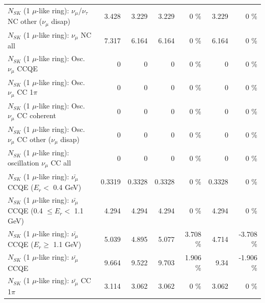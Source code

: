\begin{table}
\begin{tabular}{| l | r | r | r  r | r  r |}
   $N_{SK}$ (1 $\mu$-like ring): $\nu_\mu$/$\nu_\tau$ NC other ($\nu_\mu$ disap) &           3.428 &           3.229 &           3.229 &        0 \%  &           3.229 &        0 \%  \\ 
                                $N_{SK}$ (1 $\mu$-like ring): $\nu_{\mu}$ NC all &           7.317 &           6.164 &           6.164 &        0 \%  &           6.164 &        0 \%  \\ 
\hline
\hline
                               $N_{SK}$ (1 $\mu$-like ring): Osc. $\nu_\mu$ CCQE &               0 &               0 &               0 &        0 \%  &               0 &        0 \%  \\ 
                          $N_{SK}$ (1 $\mu$-like ring): Osc. $\nu_\mu$ CC 1$\pi$ &               0 &               0 &               0 &        0 \%  &               0 &        0 \%  \\ 
                        $N_{SK}$ (1 $\mu$-like ring): Osc. $\nu_\mu$ CC coherent &               0 &               0 &               0 &        0 \%  &               0 &        0 \%  \\ 
         $N_{SK}$ (1 $\mu$-like ring): Osc. $\nu_\mu$ CC other ($\nu_\mu$ disap) &               0 &               0 &               0 &        0 \%  &               0 &        0 \%  \\ 
                      $N_{SK}$ (1 $\mu$-like ring): oscillation $\nu_\mu$ CC all &               0 &               0 &               0 &        0 \%  &               0 &        0 \%  \\ 
\hline
\hline
          $N_{SK}$ (1 $\mu$-like ring): $\bar{\nu_\mu}$ CCQE ($E_{r} <$ 0.4 GeV) &          0.3319 &          0.3328 &          0.3328 &        0 \%  &          0.3328 &        0 \%  \\ 
 $N_{SK}$ (1 $\mu$-like ring): $\bar{\nu_\mu}$ CCQE (0.4 $\leq E_{r} <$ 1.1 GeV) &           4.294 &           4.294 &           4.294 &        0 \%  &           4.294 &        0 \%  \\ 
       $N_{SK}$ (1 $\mu$-like ring): $\bar{\nu_\mu}$ CCQE ($E_{r} \geq$ 1.1 GeV) &           5.039 &           4.895 &           5.077 &    3.708 \%  &           4.714 &   -3.708 \%  \\ 
\hline
                              $N_{SK}$ (1 $\mu$-like ring): $\bar{\nu_\mu}$ CCQE &           9.664 &           9.522 &           9.703 &    1.906 \%  &            9.34 &   -1.906 \%  \\ 
                         $N_{SK}$ (1 $\mu$-like ring): $\bar{\nu_\mu}$ CC 1$\pi$ &           3.114 &           3.062 &           3.062 &        0 \%  &           3.062 &        0 \%  \\ 

\end{tabular}
\end{table}
